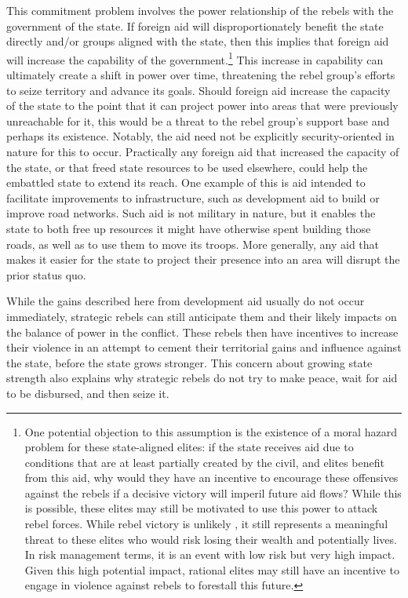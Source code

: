 \documentclass[12pt, letterpaper]{article}
\renewcommand{\cite}{\citep}
\begin{document}
This commitment problem involves the power relationship of the rebels with the government of the state. If foreign aid will disproportionately benefit the state directly and/or groups aligned with the state, then this implies that foreign aid will increase the capability of the government.\footnote{One potential objection to this assumption is the existence of a moral hazard problem for these state-aligned elites: if the state receives aid due to conditions that are at least partially created by the civil, and elites benefit from this aid, why would they have an incentive to encourage these offensives against the rebels if a decisive victory will imperil future aid flows? While this is possible, these elites may still be motivated to use this power to attack rebel forces. While rebel victory is unlikely \cite{fortna2015terrorists}, it still represents a meaningful threat to these elites who would risk losing their wealth and potentially lives. In risk management terms, it is an event with low risk but very high impact. Given this high potential impact, rational elites may still have an incentive to engage in violence against rebels to forestall this future.} This increase in capability can ultimately create a shift in power over time, threatening the rebel group’s efforts to seize territory and advance its goals. Should foreign aid increase the capacity of the state to the point that it can project power into areas that were previously unreachable for it, this would be a threat to the rebel group’s support base and perhaps its existence. Notably, the aid need not be explicitly security-oriented in nature for this to occur. Practically any foreign aid that increased the capacity of the state, or that freed state resources to be used elsewhere, could help the embattled state to extend its reach. One example of this is aid intended to facilitate improvements to infrastructure, such as development aid to build or improve road networks. Such aid is not military in nature, but it enables the state to both free up resources it might have otherwise spent building those roads, as well as to use them to move its troops. More generally, any aid that makes it easier for the state to project their presence into an area will disrupt the prior status quo. 

While the gains described here from development aid usually do not occur immediately, strategic rebels can still anticipate them and their likely impacts on the balance of power in the conflict. These rebels then have incentives to increase their violence in an attempt to cement their territorial gains and influence against the state, before the state grows stronger. This concern about growing state strength also explains why strategic rebels do not try to make peace, wait for aid to be disbursed, and then seize it.
 
\end{document}
